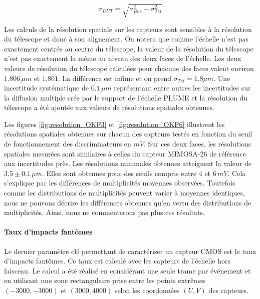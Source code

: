    \begin{equation}
    \sigma_{DUT} = \sqrt{\sigma_{Res}^2 - \sigma_{Tel}^2}
   \end{equation}

   Les calculs de la r\'esolution spatiale sur les capteurs sont sensibles \`a la r\'esolution du t\'elescope et donc \`a son alignement. On notera que comme l'\'echelle n'est pas exactement centr\'ee au centre du t\'elescope, la valeur de la r\'esolution du télescope n'est pas exactement la m\^eme au niveau des deux faces de l'\'echelle. Les deux valeurs de r\'esolution du t\'elescope calcul\'ees pour chacune des faces valent environ $1.806 \, \mu m$ et $1.801$. La diff\'erence est infime et on prend $\sigma_{Tel} = 1.8 \mu m$. Une incertitude syst\'ematique de $0.1 \, \mu m$ repr\'esentant entre autres les incertitudes sur la diffusion multiple cr\'ee par le support de l'\'echelle PLUME et la r\'esolution du t\'elescope a \'et\'e ajout\'ee aux valeurs de r\'esolutions spatiales obtenues.
   
   \medskip
   
   Les figures \ref{fig:resolution_OKF3} et \ref{fig:resolution_OKF6} illustrent les r\'esolutions spatiales obtenues sur chacun des capteurs test\'es en fonction du seuil de fonctionnement des discriminateurs en $mV$. Sur ces deux faces, les r\'esolutions spatiales mesur\'ees sont similaires \`a celles du capteur MIMOSA-26 de r\'ef\'erence aux incertitudes pr\`es. Les r\'esolutions minimales obtenues atteignent la valeur de $3.5 \pm 0.1 \, \mu m$. Elles sont obtenues pour des seuils compris entre 4 et $6 \, mV$. Cela s'explique par les diff\'erences de multiplicit\'es moyennes observ\'ees. Toutefois comme les distributions de multiplicit\'es peuvent varier \`a moyennes identiques, nous ne pouvons d\'ecrire les diff\'erences obtenues qu'en vertu des distributions de multiplicit\'es. Ainsi, nous ne commenterons pas plus ces r\'esultats.

   \paragraph{Taux d'impacts fant\^omes}
   
   Le dernier param\`etre cl\'e permettant de caract\'eriser un capteur CMOS est le taux d'impacts fant\^omes. Ce taux est calcul\'e avec les capteurs de l'\'echelle hors faisceau. Le calcul a \'et\'e r\'ealis\'e en consid\'erant une seule trame par \'ev\'enement et en utilisant une zone rectangulaire prise entre les points extr\^emes $(-3000,-3000)$ et $(3000,4000)$ selon les coordonn\'ees $(U,V)$ des capteurs.
   
